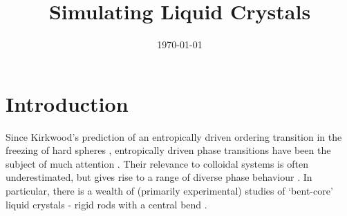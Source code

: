 \documentclass[11pt, a4paper]{article} %
\title{Simulating Liquid Crystals}
\author{\authorstyle{Kit Gallagher} 
	\institution{Supervisors: Prof Erika Eiser, Mr Jiaming Yu}}
\date{\today} %
\begin{document}





\tableofcontents %
\newpage





\section{Introduction}

Since Kirkwood's prediction of an entropically driven ordering transition in the freezing of hard spheres \cite{Kirkwood1954}, entropically driven phase transitions have been the subject of much attention \cite{Kerr1993,Frenkel1999}. Their relevance to colloidal systems is often underestimated, but gives rise to a range of diverse phase behaviour \cite{Adams1998, Anderson2002, Forsyth1978}. In particular, there is a wealth of (primarily experimental) studies of `bent-core' liquid crystals - rigid rods with a central bend \cite{Takezoe2006, Etxebarria2008, Yang2018}.
\end{document}
